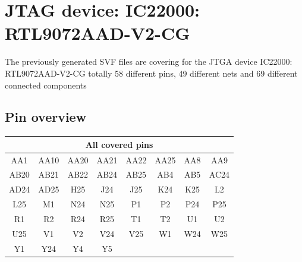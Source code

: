 \section{JTAG device: IC22000: RTL9072AAD-V2-CG}
The previously generated SVF files are covering for the JTGA device IC22000: RTL9072AAD-V2-CG totally 58 different pins, 49 different nets and 69 different connected components
\subsection{Pin overview}
 \begin{center} 
  \begin{longtable}{|c|c|c|c|c|c|c|c|} 
   \hline 
    \multicolumn{8}{|c|}{All covered pins}\\ 
   \hline 
    AA1 & AA10 & AA20 & AA21 & AA22 & AA25 & AA8 & AA9 \\ \hline 
    AB20 & AB21 & AB22 & AB24 & AB25 & AB4 & AB5 & AC24 \\ \hline 
    AD24 & AD25 & H25 & J24 & J25 & K24 & K25 & L2 \\ \hline 
    L25 & M1 & N24 & N25 & P1 & P2 & P24 & P25 \\ \hline 
    R1 & R2 & R24 & R25 & T1 & T2 & U1 & U2 \\ \hline 
    U25 & V1 & V2 & V24 & V25 & W1 & W24 & W25 \\ \hline 
    Y1 & Y24 & Y4 & Y5 &  &  &  &  \\ \hline 
  \end{longtable} 
 \end{center}
